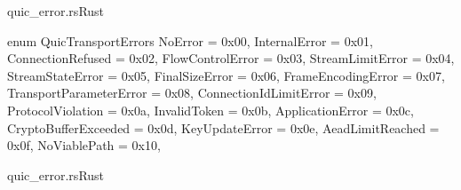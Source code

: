\begin{codeblock}{quic\_error.rs}{Rust}
    \begin{rustcode}
        enum QuicTransportErrors {
            NoError = 0x00,
            InternalError = 0x01,
            ConnectionRefused = 0x02,
            FlowControlError = 0x03,
            StreamLimitError = 0x04,
            StreamStateError = 0x05,
            FinalSizeError = 0x06,
            FrameEncodingError = 0x07,
            TransportParameterError = 0x08,
            ConnectionIdLimitError = 0x09,
            ProtocolViolation = 0x0a,
            InvalidToken = 0x0b,
            ApplicationError = 0x0c,
            CryptoBufferExceeded = 0x0d,
            KeyUpdateError = 0x0e,
            AeadLimitReached = 0x0f,
            NoViablePath = 0x10,
        }
    \end{rustcode}
    \label{quic_errors}
\end{codeblock}

\begin{codeblock}{quic\_error.rs}{Rust}
    \label{quic_errors_self_defined}
\end{codeblock}


